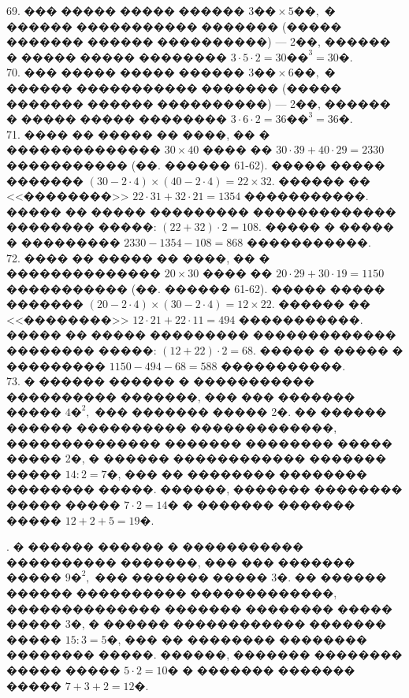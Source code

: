 \documentclass[12pt]{article}
\begin{document}
\begin{center}
\begin{figure}[ht!]
\end{figure}
\end{center}
69. ��� ����� ����� ������ $3\text{��}\times5\text{��},$ � ������ ����������� ������� (����� ������� ������ ����������) --- 2��, ������ � ����� ����� �������� $3\cdot5\cdot2=30\text{��}^3=30$�.\\
70. ��� ����� ����� ������ $3\text{��}\times6\text{��},$ � ������ ����������� ������� (����� ������� ������ ����������) --- 2��, ������ � ����� ����� �������� $3\cdot6\cdot2=36\text{��}^3=36$�.\\
71. ���� �� ����� �� ����, �� � �������������� $30\times40$ ���� �� $30\cdot39+40\cdot29=2330$ ����������� (��. ������ 61-62). ����� ����� ������� $(30-2\cdot4)\times(40-2\cdot4)=22\times32.$ ������ �� <<��������>> $22\cdot31+32\cdot21=1354$ �����������. ����� �� ����� ��������� ������������� �������� �����: $(22+32)\cdot2=108.$ ����� � ����� � ��������� $2330-1354-108=868$ �����������.\\
72. ���� �� ����� �� ����, �� � �������������� $20\times30$ ���� �� $20\cdot29+30\cdot19=1150$ ����������� (��. ������ 61-62). ����� ����� ������� $(20-2\cdot4)\times(30-2\cdot4)=12\times22.$ ������ �� <<��������>> $12\cdot21+22\cdot11=494$ �����������. ����� �� ����� ��������� ������������� �������� �����: $(12+22)\cdot2=68.$ ����� � ����� � ��������� $1150-494-68=588$ �����������.\\
73. � ������ ������ � ����������� ���������� �������, ��� ��� ������� ����� $4\text{�}^2,$ ��� ������� ����� 2�. �� ������ ������ ���������� �������������, �������������� ������� �������� ����� ����� 2�, � ������ ������������ ������� ����� $14:2=7$�, ��� �� �������� �������� �������� �����. ������, ������� �������� ����� ����� $7\cdot2=14$� � ������� ������� ����� $12+2+5=19$�.
\begin{center}
\begin{figure}[ht!]
\end{figure}
\end{center}
\newpage
{}. � ������ ������ � ����������� ���������� �������, ��� ��� ������� ����� $9\text{�}^2,$ ��� ������� ����� 3�. �� ������ ������ ���������� �������������, �������������� ������� �������� ����� ����� 3�, � ������ ������������ ������� ����� $15:3=5$�, ��� �� �������� �������� �������� �����. ������, ������� �������� ����� ����� $5\cdot2=10$� � ������� ������� ����� $7+3+2=12$�.
\end{document}
